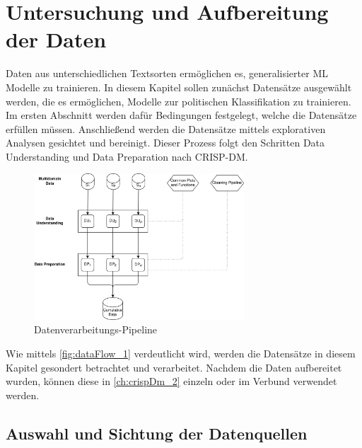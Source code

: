 
\chapter{Untersuchung und Aufbereitung der Daten} \label{ch:crispDm_1}

Daten aus unterschiedlichen Textsorten ermöglichen es, generalisierter \ac{ML} Modelle zu trainieren. In diesem Kapitel sollen zunächst Datensätze ausgewählt werden, die es ermöglichen, Modelle zur politischen Klassifikation zu trainieren. Im ersten Abschnitt werden dafür Bedingungen festgelegt, welche die Datensätze erfüllen müssen. Anschließend werden die Datensätze mittels explorativen Analysen gesichtet und bereinigt. Dieser Prozess folgt den Schritten Data Understanding und Data Preparation nach \ac{CRISP-DM}.

\begin{figure}[H]
    \centering
    \includegraphics[width=0.7\textwidth]{data/images/data_flow_v2_1.png}
    \caption[Datenverarbeitungs-Pipeline]{Datenverarbeitungs-Pipeline} \label{fig:dataFlow_1}
\end{figure}

Wie mittels \autoref{fig:dataFlow_1} verdeutlicht wird, werden die Datensätze in diesem Kapitel gesondert betrachtet und verarbeitet. Nachdem die Daten aufbereitet wurden, können diese in \autoref{ch:crispDm_2} einzeln oder im Verbund verwendet werden.

\section{Auswahl und Sichtung der Datenquellen} \label{sec:dataUnderstanding}


